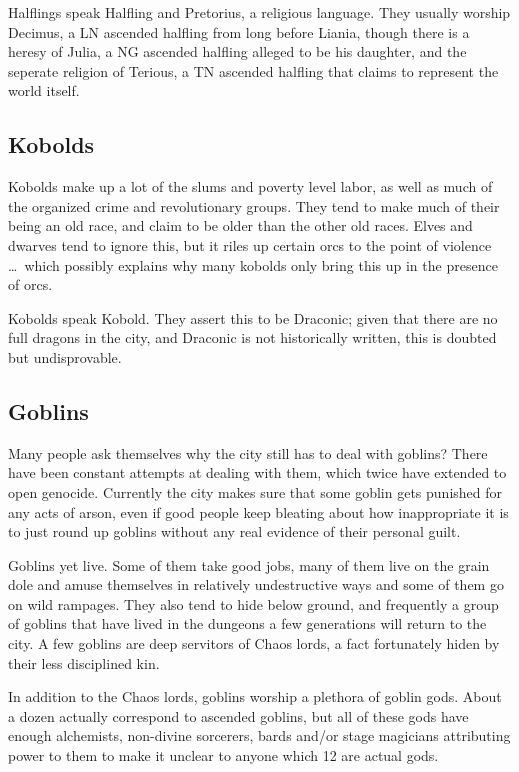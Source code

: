 \documentclass{report}
\begin{document}
Halflings speak Halfling and Pretorius, a religious language.
They usually worship Decimus, a LN ascended halfling from long before Liania, though
there is a heresy of Julia, a NG ascended halfling alleged to be his daughter,
and the seperate religion of Terious, a TN ascended halfling that claims to represent the world itself.

\subsection{Kobolds}

Kobolds make up a lot of the slums and poverty level labor, as well as much of
the organized crime and revolutionary groups. They tend to make much of their
being an old race, and claim to be older than the other old races. Elves and
dwarves tend to ignore this, but it riles up certain orcs to the point of
violence \ldots\ which possibly explains why many kobolds only bring this up
in the presence of orcs.

Kobolds speak Kobold. They assert this to be Draconic; given that there are no
full dragons in the city, and Draconic is not historically written, this is
doubted but undisprovable.

\subsection{Goblins}

Many people ask themselves why the city still has to deal with goblins? There
have been constant attempts at dealing with them, which twice have extended to
open genocide. Currently the city makes sure that some goblin gets punished for
any acts of arson, even if good people keep bleating about how inappropriate
it is to just round up goblins without any real evidence of their personal
guilt.

Goblins yet live. Some of them take good jobs, many of them live on the grain
dole and amuse themselves in relatively undestructive ways and some of them
go on wild rampages. They also tend to hide below ground, and frequently a
group of goblins that have lived in the dungeons a few generations will return
to the city. A few goblins are deep servitors of Chaos lords, a fact
fortunately hiden by their less disciplined kin.

In addition to the Chaos lords, goblins worship a plethora of goblin gods.
About a dozen actually correspond to ascended goblins, but all of these gods
have enough alchemists, non-divine sorcerers, bards and/or stage magicians
attributing power to them to make it unclear to anyone which 12 are actual
gods.
\end{document}
